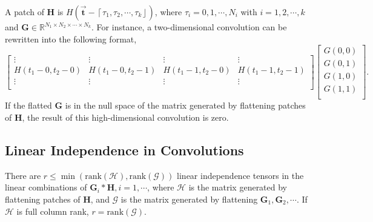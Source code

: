 \documentclass[twoside,11pt]{article}
\def\rank{\text{rank}}
\def\tvar#1{\mathbf{#1}} %
\def\vsymb#1{\vec{\mathbf{#1}}}
\def\lcerfl#1{\left\lceil{#1}\right\rfloor}
\begin{document}
  A patch of \(\tvar{H}\) is \(H(\vsymb{t} - \lcerfl{\tau_1, \tau_2, \cdots, \tau_k})\), where \(\tau_i = 0, 1, \cdots, N_i\) with \(i = 1, 2, \cdots, k\) and \(\tvar{G} \in \mathbb{R}^{N_1 \times N_2 \times \cdots \times N_k}\).
  For instance, a two-dimensional convolution can be rewritten into the following format,
  \begin{equation*}
    \begin{bmatrix}
      \vdots              & \vdots              & \vdots              & \vdots              \\
      H(t_1 - 0, t_2 - 0) & H(t_1 - 0, t_2 - 1) & H(t_1 - 1, t_2 - 0) & H(t_1 - 1, t_2 - 1) \\
      \vdots              & \vdots              & \vdots              & \vdots              \\
    \end{bmatrix}
    \begin{bmatrix}
      G(0,0) \\
      G(0,1) \\
      G(1,0) \\
      G(1,1) \\
    \end{bmatrix}.
  \end{equation*}
  If the flatted \(\tvar{G}\) is in the null space of the matrix generated by flattening patches of \(\tvar{H}\), the result of this high-dimensional convolution is zero.


\subsection{Linear Independence in Convolutions}
\label{subsec:linear-independence-in-convolutions}


\begin{lemma}
  
    There are \(r \le \min\left( \rank(\mathcal{H}), \rank(\mathcal{G})\right)\) linear independence tensors in the linear combinations of \(\tvar{G}_i * \tvar{H}, i = 1, \cdots\), where \(\mathcal{H}\) is the matrix generated by flattening patches of \(\tvar{H}\), and \(\mathcal{G}\) is the matrix generated by flattening \(\tvar{G}_1, \tvar{G}_2, \cdots\). If \(\mathcal{H}\) is full column rank, \(r = \rank(\mathcal{G})\).
  
  \label{lemma:convolution-keep-linear-dependence}
\end{lemma}
\end{document}
